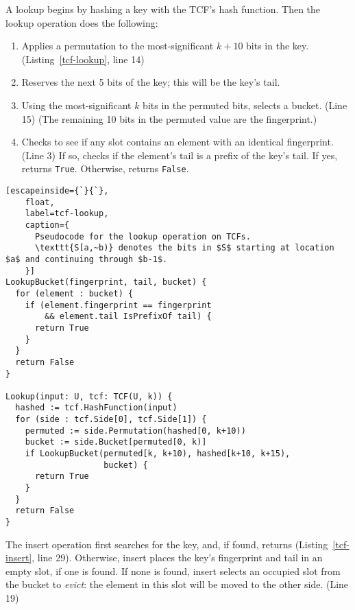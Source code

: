 \documentclass[sigconf, nonacm]{acmart}
\begin{document}
A lookup begins by hashing a key with the TCF's hash function.
Then the lookup operation does the following:

\begin{enumerate}
\item Applies a permutation to the most-significant $k+10$ bits in the key. (Listing~\ref{tcf-lookup}, line 14)
\item Reserves the next 5 bits of the key; this will be the key's tail.
\item Using the most-significant $k$ bits in the permuted bits, selects a bucket. (Line 15)
(The remaining 10 bits in the permuted value are the fingerprint.)
\item Checks to see if any slot contains an element with an identical fingerprint. (Line 3)
If so, checks if the element's tail is a prefix of the key's tail.
If yes, returns \verb|True|.
Otherwise, returns \verb|False|.
\end{enumerate}


\begin{lstlisting}[escapeinside={`}{`},
    float,
    label=tcf-lookup,
    caption={
      Pseudocode for the lookup operation on TCFs.
      \texttt{S[a,~b)} denotes the bits in $S$ starting at location $a$ and continuing through $b-1$.
    }]
LookupBucket(fingerprint, tail, bucket) {
  for (element : bucket) {
    if (element.fingerprint == fingerprint
        && element.tail IsPrefixOf tail) {
      return True
    }
  }
  return False
}

Lookup(input: U, tcf: TCF(U, k)) {
  hashed := tcf.HashFunction(input)
  for (side : tcf.Side[0], tcf.Side[1]) {
    permuted := side.Permutation(hashed[0, k+10))
    bucket := side.Bucket[permuted[0, k)]
    if LookupBucket(permuted[k, k+10), hashed[k+10, k+15),
                    bucket) {
      return True
    }
  }
  return False
}
\end{lstlisting}


The insert operation first searches for the key, and, if found, returns (Listing~\ref{tcf-insert}, line 29).
Otherwise, insert places the key's fingerprint and tail in an empty slot, if one is found.
If none is found, insert selects an occupied slot from the bucket to {\em evict}: the element in this slot will be moved to the other side. (Line 19)
\end{document}
